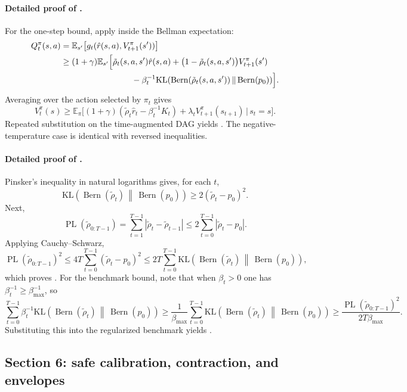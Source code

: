 \documentclass{article}
\theoremstyle{remark}
\DeclareMathOperator{\Bern}{Bern}
\newcommand{\E}{\mathbb{E}}
\newcommand{\KL}{\mathrm{KL}}
\newcommand{\pprior}{p_0}
\newcommand{\KLbin}[2]{\KL\!\left(\Bern(#1)\,\middle\|\,\Bern(#2)\right)}
\DeclareMathOperator{\PL}{PL}
\begin{document}
\paragraph{Detailed proof of .}
For the one-step bound, apply  inside the Bellman expectation:
\begin{align*}
Q_t^\pi(s,a)
&=\E_{s'}\bigl[g_t(\hat r(s,a),V_{t+1}^\pi(s'))\bigr]\\
&\ge (1+\gamma)\E_{s'}\Bigl[
    \tilde\rho_t(s,a,s')\hat r(s,a)
    +\bigl(1-\tilde\rho_t(s,a,s')\bigr)V_{t+1}^\pi(s') \\
&\hspace{8.5em}
    -\beta_t^{-1}\KLbin{\tilde\rho_t(s,a,s')}{\pprior}
\Bigr].
\end{align*}
Averaging over the action selected by $\pi_t$ gives
\[
V_t^\pi(s)\ge \E_\pi\bigl[(1+\gamma)(\tilde\rho_t\hat r_t-\beta_t^{-1}K_t)+\lambda_t V_{t+1}^\pi(s_{t+1})\,|\,s_t=s\bigr].
\]
Repeated substitution on the time-augmented DAG yields .
The negative-temperature case is identical with reversed inequalities.

\paragraph{Detailed proof of .}
Pinsker's inequality in natural logarithms gives, for each $t$,
\[
\KLbin{\tilde\rho_t}{\pprior} \ge 2(\tilde\rho_t-\pprior)^2.
\]
Next,
\[
\PL(\tilde\rho_{0:T-1})
=\sum_{t=1}^{T-1}|\tilde\rho_t-\tilde\rho_{t-1}|
\le 2\sum_{t=0}^{T-1}|\tilde\rho_t-\pprior|.
\]
Applying Cauchy--Schwarz,
\[
\PL(\tilde\rho_{0:T-1})^2\le 4T\sum_{t=0}^{T-1}(\tilde\rho_t-\pprior)^2
\le 2T\sum_{t=0}^{T-1}\KLbin{\tilde\rho_t}{\pprior},
\]
which proves .
For the benchmark bound, note that when $\beta_t>0$ one has $\beta_t^{-1}\ge \beta_{\max}^{-1}$, so
\[
\sum_{t=0}^{T-1}\beta_t^{-1}\KLbin{\tilde\rho_t}{\pprior}
\ge \frac{1}{\beta_{\max}}\sum_{t=0}^{T-1}\KLbin{\tilde\rho_t}{\pprior}
\ge \frac{\PL(\tilde\rho_{0:T-1})^2}{2T\beta_{\max}}.
\]
Substituting this into the regularized benchmark yields .

\subsection{Section 6: safe calibration, contraction, and envelopes}
\label{app:safe}
\end{document}
